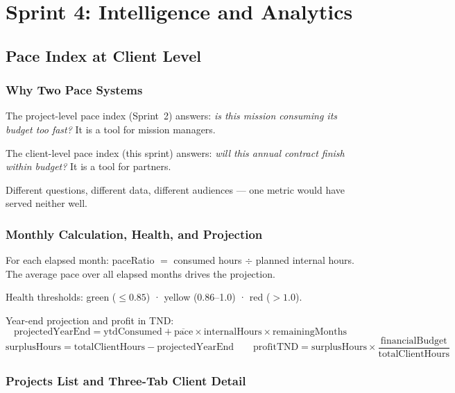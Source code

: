 \documentclass[12pt,a4paper]{report}
\begin{document}
\chapter{Sprint 4: Intelligence and Analytics}

\section{Pace Index at Client Level}

\subsection{Why Two Pace Systems}

The project-level pace index (Sprint~2) answers: \textit{is this mission consuming
its budget too fast?} It is a tool for mission managers.

The client-level pace index (this sprint) answers: \textit{will this annual contract
finish within budget?} It is a tool for partners.

Different questions, different data, different audiences --- one metric would have
served neither well.

\subsection{Monthly Calculation, Health, and Projection}

For each elapsed month: paceRatio $=$ consumed hours $\div$ planned internal hours.
The average pace over all elapsed months drives the projection.

Health thresholds: green ($\leq 0.85$) · yellow (0.86--1.0) · red ($>1.0$).

Year-end projection and profit in TND:
\[
  \text{projectedYearEnd} = \text{ytdConsumed} + \overline{\text{pace}} \times \text{internalHours} \times \text{remainingMonths}
\]
\[
  \text{surplusHours} = \text{totalClientHours} - \text{projectedYearEnd}
  \qquad
  \text{profitTND} = \text{surplusHours} \times \frac{\text{financialBudget}}{\text{totalClientHours}}
\]

\subsection{Projects List and Three-Tab Client Detail}
\end{document}
